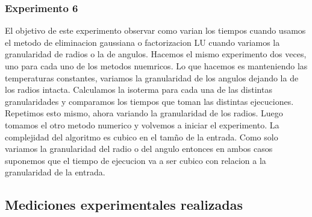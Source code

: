   	\subsubsection*{Experimento 6}
  	El objetivo de este experimento observar como varian los tiempos cuando usamos el metodo de eliminacion gaussiana o factorizacion LU cuando variamos la granularidad de radios o la de angulos.
  	Hacemos el mismo experimento dos veces, uno para cada uno de los metodos nuemricos. Lo que hacemos es manteniendo las temperaturas constantes, variamos la granularidad de los angulos dejando la de los radios intacta. Calculamos la isoterma para cada una de las distintas granularidades y comparamos los tiempos que toman las distintas ejecuciones. Repetimos esto mismo, ahora variando la granularidad de los radios. Luego tomamos el otro metodo numerico y volvemos a iniciar el experimento. 
  	La complejidad del algoritmo es cubico en el tamño de la entrada. Como solo variamos la granularidad del radio o del angulo entonces en ambos casos suponemos que el tiempo de ejecucion va a ser cubico con relacion a la granularidad de la entrada.


  \subsection{Mediciones experimentales realizadas}
